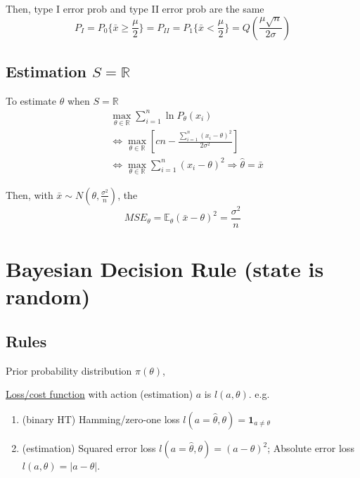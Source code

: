\documentclass[11pt]{elegantbook}
\begin{document}
Then, type I error prob and type II error prob are the same $$P_I=P_0\{\bar{x}\geq \frac{\mu}{2}\}=P_{II}=P_1\{\bar{x}< \frac{\mu}{2}\}=Q\left(\frac{\mu\sqrt{n}}{2\sigma}\right)$$

\subsection*{Estimation $S=\mathbb{R}$}
To estimate $\theta$ when $S=\mathbb{R}$
\begin{equation}
    \begin{aligned}
        &\max_{\theta\in \mathbb{R}}\sum_{i=1}^n\ln P_\theta(x_i)\\
        &\Leftrightarrow \max_{\theta\in \mathbb{R}} \left[cn-\frac{\sum_{i=1}^n(x_i-\theta)^2}{2\sigma^2}\right]\\
        &\Leftrightarrow \max_{\theta\in \mathbb{R}} \sum_{i=1}^n(x_i-\theta)^2 \Rightarrow \hat{\theta}=\bar{x}
    \end{aligned}
    \nonumber
\end{equation}

Then, with $\bar{x}\sim N(\theta,\frac{\sigma^2}{n})$, the $$MSE_\theta=\mathbb{E}_\theta\left(\bar{x}-\theta\right)^2=\frac{\sigma^2}{n}$$

\section{Bayesian Decision Rule (state is random)}
\subsection{Rules}
Prior probability distribution $\pi(\theta)$,

\underline{Loss/cost function} with action (estimation) $a$ is $l(a,\theta)$. e.g.
\begin{enumerate}
    \item (binary HT) Hamming/zero-one loss $l(a=\hat{\theta},\theta)=\mathbf{1}_{a\neq \theta}$
    \item (estimation) Squared error loss $l(a=\hat{\theta},\theta)=(a-\theta)^2$; Absolute error loss $l(a,\theta)=|a-\theta|$.
\end{enumerate}
\end{document}
